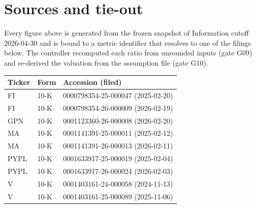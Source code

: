 \documentclass[10pt]{article}
\begin{document}
\section*{Sources and tie-out}
{\scriptsize Every figure above is generated from the frozen snapshot of Information cutoff 2026-04-30 and is bound to a metric identifier that resolves to one of the filings below. The controller recomputed each ratio from unrounded inputs (gate G09) and re-derived the valuation from the assumption file (gate G10).}\par
{\scriptsize\begin{tabular}{@{}lll@{}}\toprule Ticker & Form & Accession (filed) \\\midrule
FI & 10-K & 0000798354-25-000047 (2025-02-20) \\
FI & 10-K & 0000798354-26-000009 (2026-02-19) \\
GPN & 10-K & 0001123360-26-000008 (2026-02-20) \\
MA & 10-K & 0001141391-25-000011 (2025-02-12) \\
MA & 10-K & 0001141391-26-000013 (2026-02-11) \\
PYPL & 10-K & 0001633917-25-000019 (2025-02-04) \\
PYPL & 10-K & 0001633917-26-000024 (2026-02-03) \\
V & 10-K & 0001403161-24-000058 (2024-11-13) \\
V & 10-K & 0001403161-25-000089 (2025-11-06) \\
\bottomrule\end{tabular}}\par
{}\par
\end{document}
